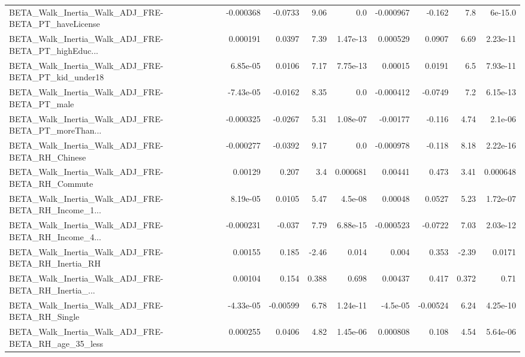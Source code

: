 \begin{tabular}{lrrrrrrrr}
BETA\_Walk\_Inertia\_Walk\_ADJ\_FRE-BETA\_PT\_haveLicense &   -0.000368 &      -0.0733 &     9.06 &      0.0 &  -0.000967 &      -0.162 &          7.8 &       6e-15.0 \\
BETA\_Walk\_Inertia\_Walk\_ADJ\_FRE-BETA\_PT\_highEduc... &    0.000191 &       0.0397 &     7.39 & 1.47e-13 &   0.000529 &      0.0907 &         6.69 &      2.23e-11 \\
BETA\_Walk\_Inertia\_Walk\_ADJ\_FRE-BETA\_PT\_kid\_under18 &    6.85e-05 &       0.0106 &     7.17 & 7.75e-13 &    0.00015 &      0.0191 &          6.5 &      7.93e-11 \\
BETA\_Walk\_Inertia\_Walk\_ADJ\_FRE-BETA\_PT\_male        &   -7.43e-05 &      -0.0162 &     8.35 &      0.0 &  -0.000412 &     -0.0749 &          7.2 &      6.15e-13 \\
BETA\_Walk\_Inertia\_Walk\_ADJ\_FRE-BETA\_PT\_moreThan... &   -0.000325 &      -0.0267 &     5.31 & 1.08e-07 &   -0.00177 &      -0.116 &         4.74 &       2.1e-06 \\
BETA\_Walk\_Inertia\_Walk\_ADJ\_FRE-BETA\_RH\_Chinese     &   -0.000277 &      -0.0392 &     9.17 &      0.0 &  -0.000978 &      -0.118 &         8.18 &      2.22e-16 \\
BETA\_Walk\_Inertia\_Walk\_ADJ\_FRE-BETA\_RH\_Commute     &     0.00129 &        0.207 &      3.4 & 0.000681 &    0.00441 &       0.473 &         3.41 &      0.000648 \\
BETA\_Walk\_Inertia\_Walk\_ADJ\_FRE-BETA\_RH\_Income\_1... &    8.19e-05 &       0.0105 &     5.47 &  4.5e-08 &    0.00048 &      0.0527 &         5.23 &      1.72e-07 \\
BETA\_Walk\_Inertia\_Walk\_ADJ\_FRE-BETA\_RH\_Income\_4... &   -0.000231 &       -0.037 &     7.79 & 6.88e-15 &  -0.000523 &     -0.0722 &         7.03 &      2.03e-12 \\
BETA\_Walk\_Inertia\_Walk\_ADJ\_FRE-BETA\_RH\_Inertia\_RH  &     0.00155 &        0.185 &    -2.46 &    0.014 &      0.004 &       0.353 &        -2.39 &        0.0171 \\
BETA\_Walk\_Inertia\_Walk\_ADJ\_FRE-BETA\_RH\_Inertia\_... &     0.00104 &        0.154 &    0.388 &    0.698 &    0.00437 &       0.417 &        0.372 &          0.71 \\
BETA\_Walk\_Inertia\_Walk\_ADJ\_FRE-BETA\_RH\_Single      &   -4.33e-05 &     -0.00599 &     6.78 & 1.24e-11 &   -4.5e-05 &    -0.00524 &         6.24 &      4.25e-10 \\
BETA\_Walk\_Inertia\_Walk\_ADJ\_FRE-BETA\_RH\_age\_35\_less &    0.000255 &       0.0406 &     4.82 & 1.45e-06 &   0.000808 &       0.108 &         4.54 &      5.64e-06 \\

\end{tabular}
